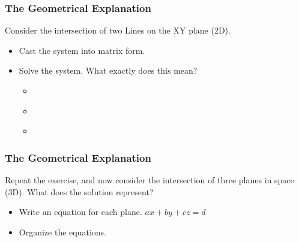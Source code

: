\documentclass[fleqn]{beamer} %
\newcommand{\sectionIsubsectionIIItitle}{The Geometrical Explanation}
\begin{document}
			\begin{frame} 
				\frametitle{\sectionIsubsectionIIItitle}
				\bigskip

			 	Consider the intersection of two Lines on the XY plane (2D).  \hspace{5mm} 
  
				\begin{itemize}
		
					\item Cast the system into matrix form. \vspace{10mm}
			
					\item Solve the system. What exactly does this mean?\\
				
					\begin{itemize}
							\item \hspace{10mm} \\
							\item \hspace{10mm} \\
							\item \hspace{10mm} \\
					\end{itemize}
			
				\end{itemize}
	
				\btVFill
			\end{frame}	

			\begin{frame} 
				\frametitle{\sectionIsubsectionIIItitle}
				\bigskip

		 		Repeat the exercise, and now consider the intersection of three planes in space (3D). What does the solution represent?  \hspace{3mm} \\ 
  
				\begin{itemize}
		
					\item Write an equation for each plane.  $ax+by+cz=d$ \vspace{3mm} \\
		
					\item Organize the equations. \vspace{3mm} \\
				\end{itemize}
				
				\btVFill
			\end{frame}	
\end{document}
